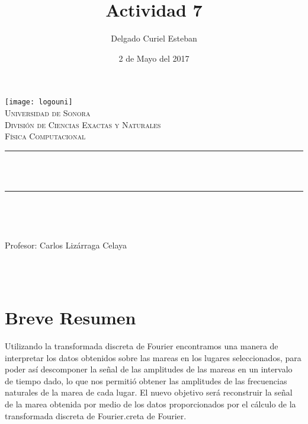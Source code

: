 \documentclass[12pt]{article}
\title{Actividad 7}  %
\author{\centering Delgado Curiel Esteban}											%
\date{2 de Mayo del 2017} %
\makeatletter
\let\thetitle\@title
\let\theauthor\@author
\let\thedate\@date
\makeatother
\begin{document}

\begin{titlepage}
	\begin{centering}
    
    \vspace*{0.5 cm}
    \texttt{[image: logouni]}\\[0.5 cm]	%
    \textsc{\Large Universidad de Sonora}\\[1.0 cm]	%
	\textsc{\Large División de Ciencias Exactas y Naturales}\\[0.5 cm]				%
	\textsc{\large Física Computacional}\\[0.5 cm]	
	\rule{\linewidth}{0.2 mm} \\[0.4 cm]
	{ \huge \bfseries \thetitle}\\
	\rule{\linewidth}{0.2 mm} \\[0.5 cm]
	
	\begin{minipage}{\textwidth}
		\begin{flushleft} 
			\emph{\Large} \large \\
			\theauthor
			\end{flushleft}
	
		\begin{flushleft} 
			{Profesor:} \large \centering Carlos Lizárraga Celaya	
			\end{flushleft}
	\end{minipage}\\[1 cm]
	{\large \thedate}\\[2 cm]
 
	\vfill
    \end{centering}
    \end{titlepage}
    
\newpage

\section*{Breve Resumen}
Utilizando la transformada discreta de Fourier encontramos una manera de interpretar los datos obtenidos sobre las mareas en los lugares seleccionados, para poder así descomponer la señal de las amplitudes de las mareas en un intervalo de tiempo dado, lo que nos permitió obtener las amplitudes de las frecuencias naturales de la marea de cada lugar. El nuevo objetivo será reconstruir la señal de la marea obtenida por medio de los datos proporcionados por el cálculo de la transformada discreta de Fourier.creta de Fourier.
\end{document}
